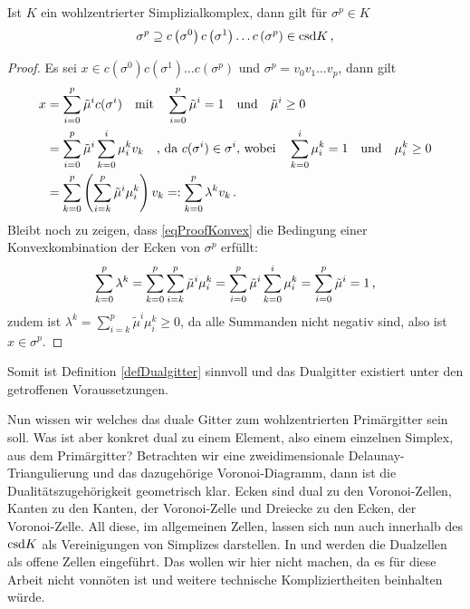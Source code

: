     \begin{lemma}
      Ist \( K \) ein wohlzentrierter Simplizialkomplex, dann gilt für \( \sigma^{p}\in K \)
      \begin{align}
        \sigma^{p} \supseteq c\left( \sigma^{0} \right) c\left( \sigma^{1} \right) \ldots c\left( \sigma^{p} \right) \in\text{csd} K \,\text{,}
      \end{align}
      \begin{proof}
        Es sei \( x\in c\left( \sigma^{0} \right) c\left( \sigma^{1} \right) \ldots c\left( \sigma^{p} \right)\) 
        und \( \sigma^{p} = v_{0}v_{1}\ldots v_{p} \), dann gilt
        \begin{align}
          x &= \sum_{i=0}^{p} \tilde{\mu}^{i}c(\sigma^{i}) \quad\text{mit}\quad \sum_{i=0}^{p}\tilde{\mu}^{i} = 1 \quad\text{und}\quad \tilde{\mu}^{i} \ge 0 \\
            &= \sum_{i=0}^{p} \tilde{\mu}^{i} \sum_{k=0}^{i}\mu_{i}^{k} v_{k} \quad\text{, da \( c(\sigma^{i})\in\sigma^{i} \), wobei}\quad  \sum_{k=0}^{i}\mu_{i}^{k} = 1 \quad\text{und}\quad \mu_{i}^{k} \ge 0 \\
            &= \sum_{k=0}^{p} \left( \sum_{i=k}^{p} \tilde{\mu}^{i} \mu_{i}^{k} \right) v_{k}
             =: \sum_{k=0}^{p} \lambda^{k} v_{k} \,\text{.} \label{eqProofKonvex}
        \end{align}
        Bleibt noch zu zeigen, dass \eqref{eqProofKonvex} die Bedingung einer Konvexkombination der Ecken von \( \sigma^{p} \) erfüllt:
        \begin{align}
           \sum_{k=0}^{p} \lambda^{k} = \sum_{k=0}^{p} \sum_{i=k}^{p} \tilde{\mu}^{i} \mu_{i}^{k}
                                      = \sum_{i=0}^{p} \tilde{\mu}^{i} \sum_{k=0}^{i}\mu_{i}^{k}
                                      = \sum_{i=0}^{p} \tilde{\mu}^{i}
                                      = 1 \,\text{,}
        \end{align}
        zudem ist \( \lambda^{k} = \sum_{i=k}^{p} \tilde{\mu}^{i} \mu_{i}^{k}  \ge 0\), da alle Summanden nicht negativ sind, also ist \( x \in \sigma^{p} \).
      \end{proof}
    \end{lemma}
    Somit ist Definition \ref{defDualgitter} sinnvoll und das Dualgitter existiert unter den getroffenen Voraussetzungen.

    Nun wissen wir welches das duale Gitter zum wohlzentrierten Primärgitter sein soll.
    Was ist aber konkret dual zu einem Element, also einem einzelnen Simplex, aus dem Pri\-mär\-gitter?
    Betrachten wir eine zweidimensionale Delaunay-Triangulierung und das dazugehörige Voronoi-Diagramm, 
    dann ist die Dualitätszugehörigkeit geometrisch klar.
    Ecken sind dual zu den Voronoi-Zellen, Kanten zu den Kanten, der Voronoi-Zelle und Dreiecke zu den Ecken, der Voronoi-Zelle.
    All diese, im allgemeinen Zellen, lassen sich nun auch innerhalb des \( \text{csd} K \) als Vereinigungen von Simplizes darstellen.
    In \cite{hirani} und \cite{munkres} werden die Dualzellen als offene Zellen eingeführt.
    Das wollen wir hier nicht machen, da es für diese Arbeit nicht vonnöten ist und weitere technische Kompliziertheiten beinhalten würde.

